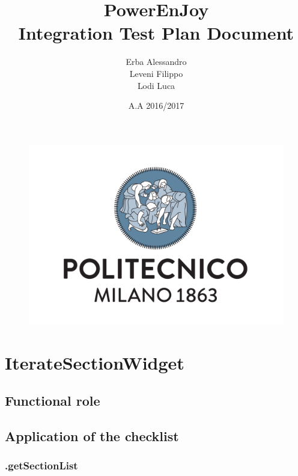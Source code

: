 \documentclass[english]{article}
\begin{document}
\lstset{language=Java} 

	\begin{figure}
		\centering
		\includegraphics[scale=0.5]{logo.pdf} 
	\end{figure}


	\title{PowerEnJoy\\
	Integration Test Plan Document\\
	}

	\date{A.A 2016/2017}
	
	\author{Erba Alessandro\\
	 Leveni Filippo\\
	 Lodi Luca}
	
	\maketitle
	\pagebreak{}
	\tableofcontents{} \pagebreak{}
	
\section{IterateSectionWidget}
	\subsection{Functional role}
	\subsection{Application of the checklist}
	
\subsubsection*{.getSectionList}	
\end{document}
